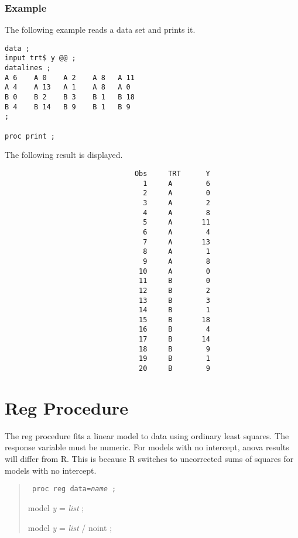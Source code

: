 \documentclass[12pt]{article}
\begin{document}
\subsubsection*{Example}

The following example reads a data set
and prints it.

{\footnotesize\begin{verbatim}
data ;
input trt$ y @@ ;
datalines ;
A 6    A 0    A 2    A 8   A 11
A 4    A 13   A 1    A 8   A 0
B 0    B 2    B 3    B 1   B 18
B 4    B 14   B 9    B 1   B 9
;

proc print ;
\end{verbatim}}

The following result is displayed.

{\footnotesize\begin{verbatim}
                               Obs     TRT      Y
                                 1     A        6
                                 2     A        0
                                 3     A        2
                                 4     A        8
                                 5     A       11
                                 6     A        4
                                 7     A       13
                                 8     A        1
                                 9     A        8
                                10     A        0
                                11     B        0
                                12     B        2
                                13     B        3
                                14     B        1
                                15     B       18
                                16     B        4
                                17     B       14
                                18     B        9
                                19     B        1
                                20     B        9
\end{verbatim}}

\newpage

\section{Reg Procedure}

The reg procedure fits a linear model to data
using ordinary least squares.
The response variable must be numeric.
For models with no intercept, anova results will differ from R.
This is because R switches to uncorrected sums of squares
for models with no intercept.

\begin{quote}
{\tt
proc reg data={\it name} ;

model {\it y} = {\it list} ;

model {\it y} = {\it list} / noint ;
}
\end{quote}
\end{document}
